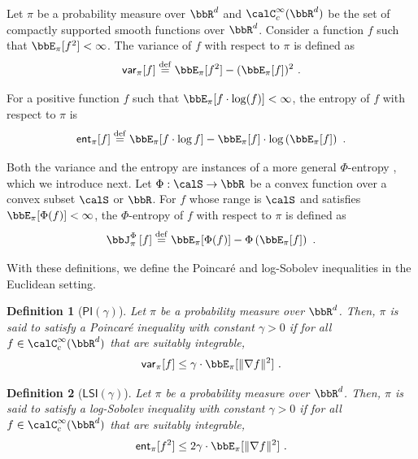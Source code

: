 \documentclass[11pt]{article}
\newtheorem{definition}{Definition}[section]
\newcounter{ct}
\newcommand{\defeq}{\overset{\mathrm{def}}{=}}
\newcommand{\PI}[1]{\mathsf{PI}\left(#1\right)}
\newcommand{\LSI}[1]{\mathsf{LSI}\left(#1\right)}
\newcommand{\Phient}[3]{
    \ensuremath{\if$#3$\bbJ_{#1}^{#2}\else\bbJ_{#1}^{#2}\left[#3\right]\fi}}
\newcommand{\cssf}[1]{\calC_{c}^{\infty}(#1)}
\newcommand{\var}{\mathsf{var}}
\newcommand{\ent}{\mathsf{ent}}
\begin{document}
Let \(\pi\) be a probability measure over \(\bbR^{d}\) and \(\cssf{\bbR^{d}}\) be the set of compactly supported smooth functions over \(\bbR^{d}\).
Consider a function \(f\) such that \(\bbE_{\pi}[f^{2}] < \infty\).
The variance of \(f\) with respect to \(\pi\) is defined as
\begin{equation*}
    \var{}_{\pi}[f] \defeq \bbE_{\pi}[f^{2}] - (\bbE_{\pi}[f])^{2}~.
\end{equation*}

For a positive function \(f\) such that \(\bbE_{\pi}[f \cdot \log (f)] < \infty\), the entropy of \(f\) with respect to \(\pi\) is
\begin{equation*}
    \ent{}_{\pi}[f] \defeq \bbE_{\pi}[f \cdot \log f] - \bbE_{\pi}[f] \cdot \log\left(\bbE_{\pi}[f]\right)~.
\end{equation*}

Both the variance and the entropy are instances of a more general \(\Phi\)-entropy \citep{chafai2004entropies}, which we introduce next.
Let \(\Phi : \calS \to \bbR\) be a convex function over a convex subset \(\calS\) or \(\bbR\).
For \(f\) whose range is \(\calS\) and satisfies \(\bbE_{\pi}[\Phi(f)] < \infty\), the \(\Phi\)-entropy of \(f\) with respect to \(\pi\) is defined as
\begin{equation}
\label{eq:phi-entropy}
\Phient{\pi}{\Phi}{f} \defeq \bbE_{\pi}[\Phi(f)] - \Phi\left(\bbE_{\pi}[f]\right)~.
\end{equation}

With these definitions, we define the Poincar\'{e} and log-Sobolev inequalities in the Euclidean setting.
\begin{definition}[\(\PI{\gamma}\)]
Let \(\pi\) be a probability measure over \(\bbR^{d}\).
Then, \(\pi\) is said to satisfy a \emph{Poincar\'{e} inequality with constant \(\gamma > 0\)} if for all \(f \in \cssf{\bbR^{d}}\) that are suitably integrable,
\begin{equation*}
    \var{}_{\pi}[f] \leq \gamma \cdot \bbE_{\pi}[\|\nabla f\|^{2}]~.
\end{equation*}
\end{definition}

\begin{definition}[\(\LSI{\gamma}\)]
Let \(\pi\) be a probability measure over \(\bbR^{d}\).
Then, \(\pi\) is said to satisfy a \emph{log-Sobolev inequality with constant \(\gamma > 0\)} if for all \(f \in \cssf{\bbR^{d}}\) that are suitably integrable,
\begin{equation*}
    \ent{}_{\pi}[f^{2}] \leq 2\gamma \cdot \bbE_{\pi}[\|\nabla f\|^{2}]~.
\end{equation*}
\end{definition}
\end{document}
